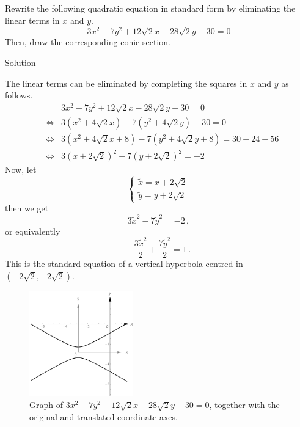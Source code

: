 \begin{example}
Rewrite the following quadratic equation  in standard form by eliminating the linear terms in $x$ and $y$.
\[ 3x^2 -7y^2 + 12\sqrt{2}x - 28 \sqrt{2}y - 30=0 \]
Then, draw the corresponding conic section. 

\ifanalysis\pagebreak\fi
{}Solution 


The linear terms can be eliminated by completing the squares in $x$ and $y$ as follows.
\begin{eqnarray*}
&&3x^2 -7y^2 + 12\sqrt{2}x - 28 \sqrt{2}y - 30=0 \\
&\Leftrightarrow& 3(x^2 + 4\sqrt{2} x ) -7(y^2 + 4 \sqrt{2}y ) - 30=0 \\
&\Leftrightarrow& 3(x^2 + 4\sqrt{2} x + 8) -7 (y^2 + 4 \sqrt{2}y + 8) = 30+24-56 \\
&\Leftrightarrow& 3(x + 2\sqrt{2})^2 -7 (y + 2 \sqrt{2})^2 = -2 
\end{eqnarray*}
Now, let 
\[\left\{ \begin{array}{r}
\widetilde{x} = x + 2\sqrt{2}\\
\widetilde{y} = y + 2\sqrt{2}
 \end{array} \right.
\]
then we get 
\[
3\widetilde{x}^2 - 7\widetilde{y}^2 = -2\,,
\]
or equivalently 
$$
-\dfrac{3\widetilde{x}^2}{2}+\dfrac{7\widetilde{y}^2}{2}=1\,.
$$
This is the standard equation of a vertical hyperbola  centred in $(-2\sqrt{2}, -2\sqrt{2})$.


\begin{figure}[H]
	\begin{center}
			\includegraphics[width=0.4\textwidth]{fig_trans_44}
	\caption{Graph of $3x^2 -7y^2 + 12\sqrt{2}x - 28 \sqrt{2}y - 30=0$, together with the original and translated coordinate axes. }
	\label{fig_trans_44}
	\end{center}
\end{figure}


\end{example}

